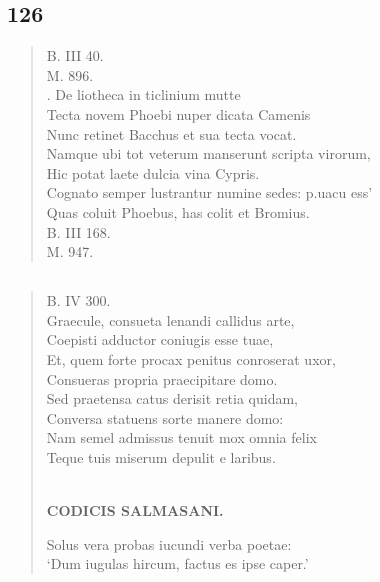 \documentclass[11pt, a4paper]{report}
\begin{document}
            \subsection*{126}
      \begin{verse}
      B. III 40. \\ M. 896. \\ .  \lbrack De liotheca in ticlinium mutte \rbrack  \\ Tecta novem Phoebi nuper dicata Camenis \\ Nunc retinet Bacchus et sua tecta vocat. \\ Namque ubi tot veterum manserunt scripta virorum, \\ Hic potat laete dulcia vina Cypris. \\ Cognato semper lustrantur numine sedes: p.uacu ess’ \\ Quas coluit Phoebus, has colit et Bromius. \\ B. III 168. \\ M. 947. \\ 
      \end{verse}
  
            \subsection*{}
      \begin{verse}
      B. IV 300. \\ Graecule, consueta lenandi callidus arte, \\ Coepisti adductor coniugis esse tuae, \\ Et, quem forte procax penitus conroserat uxor, \\ Consueras propria praecipitare domo. \\ Sed praetensa catus derisit retia quidam, \\ Conversa statuens sorte manere domo: \\ Nam semel admissus  \lbrack tenuit mox omnia felix \rbrack  \\ Teque tuis miserum depulit e laribus. \\ 
        ﻿\pagebreak 
    \begin{center} \textbf{CODICIS SALMASANI.} \end{center}Solus vera probas iucundi verba poetae: \\ ‘Dum iugulas hircum, factus es ipse caper.’ \\ 
      \end{verse}
  
\end{document}
